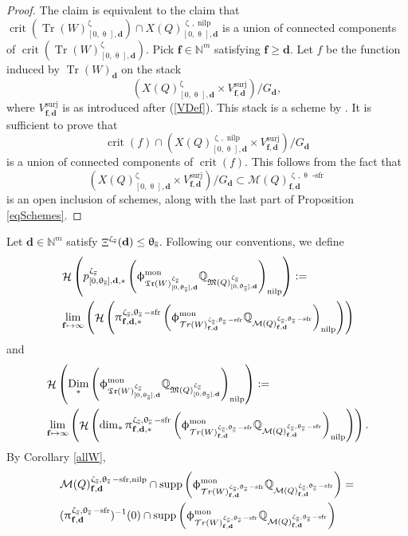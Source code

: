 \documentclass[a4paper,10pt]{amsart}
\newcommand{\dd}{\mathbf{d}}
\newcommand{\ff}{\mathbf{f}}
\DeclareMathOperator{\sfr}{-sfr}
\newcommand{\WW}{\mathcal{T}r(W)}
\newcommand{\WWW}{\mathfrak{Tr}(W)}
\newcommand{\Mst}{\mathfrak{M}}
\newcommand{\Msp}{\mathcal{M}}
\newcommand{\phim}[1]{\phi^{\mon}_{#1}}
\renewcommand{\theta}{\uptheta}
\renewcommand{\zeta}{\upzeta}
\renewcommand{\pi}{\uppi\hspace{0.05em}}
\renewcommand{\phi}{\upphi}
\DeclareMathOperator{\nilp}{nilp}
\DeclareMathOperator{\Dim}{Dim}
\DeclareMathOperator{\surj}{surj}
\DeclareMathOperator{\crit}{crit}
\DeclareMathOperator{\mon}{mon}
\DeclareMathOperator{\Mu}{\Upxi}
\DeclareMathOperator{\supp}{supp}
\DeclareMathOperator{\Tr}{Tr}
\DeclareMathOperator{\Ss}{\overline{s}}
\DeclareMathOperator{\Ho}{\mathcal{H}}
\begin{document}
\begin{proof}
The claim is equivalent to the claim that $\crit\left(\Tr(W)^{\zeta_{\Ss}}_{[0,\theta_{\Ss}],\dd}\right)\cap X(Q)_{[0,\theta_{\Ss}],\dd}^{\zeta_{\Ss},\nilp}$ is a union of connected components of $\crit\left(\Tr(W)^{\zeta_{\Ss}}_{[0,\theta_{\Ss}],\dd}\right)$.  Pick $\ff\in\mathbb{N}^m$ satisfying $\ff\geq \dd$.  Let $f$ be the function induced by $\Tr(W)_{\dd}$ on the stack
\[
(X(Q)^{\zeta_{\Ss}}_{[0,\theta_{\Ss}],\dd}\times V^{\surj}_{\ff,\dd})/G_{\dd}, 
\]
where $V^{\surj}_{\ff,\dd}$ is as introduced after (\ref{VDef}).  This stack is a scheme by \cite[Prop.23]{EdGr98}.  It is sufficient to prove that
\[
\crit(f)\cap \left(X(Q)^{\zeta_{\Ss},\nilp}_{[0,\theta_{\Ss}],\dd}\times V^{\surj}_{\ff,\dd}\right)/G_{\dd}
\]
is a union of connected components of $\crit(f)$.  This follows from the fact that 
\[
\left(X(Q)^{\zeta_{\Ss}}_{[0,\theta_{\Ss}],\dd}\times V^{\surj}_{\ff,\dd}\right)/G_{\dd}\subset \Msp(Q)^{\zeta_{\Ss},\theta_{\Ss}\sfr}_{\ff,\dd}
\]
is an open inclusion of schemes, along with the last part of Proposition \ref{eqSchemes}.

\end{proof}
Let $\dd\in\mathbb{N}^m$ satisfy $\Mu^{\zeta_{\Ss}}(\dd)\leq \theta_{\Ss}$.  Following our conventions, we define
\begin{align*}
&\Ho\left(p_{[0,\theta_{\Ss}],\dd,*}^{\zeta_{\Ss}}\left(\phim{\WWW^{\zeta_{\Ss}}_{[0,\theta_{\Ss}],\dd}}\mathbb{Q}_{\Mst(Q)^{\zeta_{\Ss}}_{[0,\theta_{\Ss}],\dd}}\right)_{\nilp}\right):=\\&\lim_{\ff\mapsto \infty}\left( \Ho\left( \pi^{\zeta_{\Ss},\theta_{\Ss}\sfr}_{\ff,\dd,*}\left( \phim{\WW_{\ff,\dd}^{\zeta_{\Ss},\theta_{\Ss}\sfr}}\mathbb{Q}_{\Msp(Q)_{\ff,\dd}^{\zeta_{\Ss},\theta_{\Ss}\sfr}}\right)_{\nilp}\right)\right)
\end{align*}
and
\begin{align*}
&\Ho\left(\Dim_{*}\left(\phim{\WWW^{\zeta_{\Ss}}_{[0,\theta_{\Ss}],\dd}}\mathbb{Q}_{\Mst(Q)^{\zeta_{\Ss}}_{[0,\theta_{\Ss}],\dd}}\right)_{\nilp}\right):=\\&\lim_{\ff\mapsto \infty}\left( \Ho\left( \dim_*\pi^{\zeta_{\Ss},\theta_{\Ss}\sfr}_{\ff,\dd,*}\left( \phim{\WW_{\ff,\dd}^{\zeta_{\Ss},\theta_{\Ss}\sfr}}\mathbb{Q}_{\Msp(Q)_{\ff,\dd}^{\zeta_{\Ss},\theta_{\Ss}\sfr}}\right)_{\nilp}\right)\right).
\end{align*}
By Corollary \ref{allW},
\begin{align*}
&\Msp(Q)^{\zeta_{\Ss},\theta_{\Ss}\sfr,\nilp}_{\ff,\dd}\cap \supp\left(\phim{\WW_{\ff,\dd}^{\zeta_{\Ss},\theta_{\Ss}\sfr}}\mathbb{Q}_{\Msp(Q)_{\ff,\dd}^{\zeta_{\Ss},\theta_{\Ss}\sfr}}\right)=
\\&(\pi_{\ff,\dd}^{\zeta_{\Ss},\theta_{\Ss}\sfr})^{-1}(0)\cap \supp\left(\phim{\WW_{\ff,\dd}^{\zeta_{\Ss},\theta_{\Ss}\sfr}}\mathbb{Q}_{\Msp(Q)_{\ff,\dd}^{\zeta_{\Ss},\theta_{\Ss}\sfr}}\right)
\end{align*}
\end{document}
